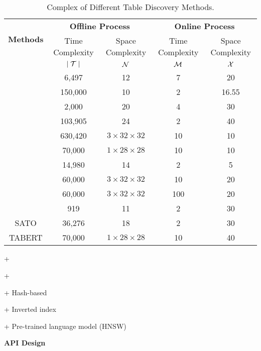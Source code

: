     \begin{table*}[t]
	\centering
	\caption{Complex of Different Table Discovery Methods.}  \vspace{-1em}
	{
		\begin{tabular}{c||cc|cc}
			\toprule
			\multirow{2}{1cm}{\textbf{Methods}} & \multicolumn{2}{c}{\textbf{Offline Process}} & \multicolumn{2}{c}{\textbf{Online Process}} \\ 
			&Time Complexity    & Space Complexity & Time Complexity & Space Complexity \\ 
			\midrule[1pt]     %
			
			\starmie         & $\mid \mathcal{T} \mid$         & $\mathcal{N}$                   & $\mathcal{M}$               & $\mathcal{X}$      \\
			\josie             & 6,497          & 12                   & 7                & 20        \\         
			\lsh          & 150,000        & 10                   & 2                & 16.55     \\
			\dlll          & 2,000          & 20                   & 4                & 30       \\
			\pex          & 103,905        & 24                   & 2                & 40      \\
			\deepjoin             & 630,420        & $3\times32\times32$    & 10               & 10      \\
			\tus          & 70,000         & $1\times28\times28$    & 10               & 10          \\
			\santos              & 14,980         & 14                   & 2                & 5     \\
			\frt         & 60,000         & $3\times32\times32$    & 10               & 20       \\
			\infogather        & 60,000         & $3\times32\times32$    & 100              & 20      \\
			\aurum            & 919            & 11                   & 2                & 30       \\
			SATO            & 36,276         & 18                   & 2                & 30    \\
			TABERT         & 70,000         & $1\times28\times28$    & 10               & 40       \\
		
			\bottomrule
		\end{tabular}
	}
	\vspace{-1em}
	\label{table:complex_analyse}
	\end{table*}

+ 

+ 

+ Hash-based

+ Inverted index 

+ Pre-trained language model (HNSW)


\noindent\textbf{API Design}

